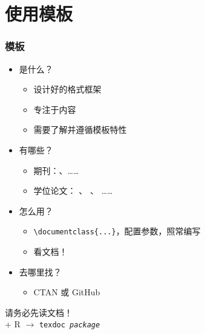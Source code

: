 \section{使用模板}

\begin{frame}[fragile]
    \frametitle{模板}
    \begin{itemize}
        \item<+-> 是什么？
            \begin{itemize}
                \item 设计好的格式框架
                \item 专注于内容
                \item 需要了解并遵循模板特性
            \end{itemize}
        \item<+-> 有哪些？
            \begin{itemize}
                \item 期刊：、……
                \item 学位论文： 、 、 ……
            \end{itemize}
        \item<+-> 怎么用？
            \begin{itemize}
                \item \verb|\documentclass{...}|，配置参数，照常编写
                \item \textcolor{tip}{看文档！}
            \end{itemize}
        \item<+-> 去哪里找？
            \begin{itemize}
                \item CTAN  或 GitHub \href{https://github.com}{\faGithub}
            \end{itemize}
    \end{itemize}
\end{frame}

\begin{frame}[standout]
    \huge 请务必先读文档！ \\[1ex]
    \footnotesize \faWindows{} + {\ttfamily R} $\to$ \texttt{texdoc \textit{package}}
\end{frame}